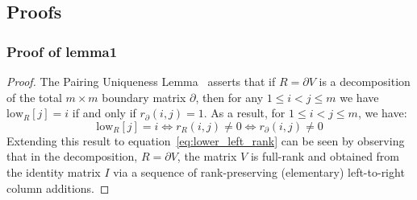 \documentclass[10pt]{article}
\newcommand{\+}{%
	\raisebox{0.18ex}{\scaleobj{0.55}{+}}
}
\begin{document}
\subsection{Proofs}
\subsubsection{Proof of lemma1}
\begin{proof}
	The Pairing Uniqueness Lemma~\cite{} asserts that if $R = \partial V$ is a decomposition of the total $m \times m$ boundary matrix $\partial$, then for any $1 \leq i < j \leq m$ we have $\mathrm{low}_R[j] = i$ if and only if $r_\partial(i,j) = 1$. 
	As a result, for $1 \leq i < j \leq m$, we have:
\begin{equation}
	\mathrm{low}_R[j] = i \iff r_R(i,j) \neq 0 \iff r_\partial(i,j) \neq 0
\end{equation} 
Extending this result to equation~\eqref{eq:lower_left_rank} can be seen by observing that in the decomposition, $R = \partial V$, the matrix $V$ is full-rank and obtained from the identity matrix $I$ via a sequence of rank-preserving (elementary) left-to-right column additions.  
\end{proof}
\end{document}
